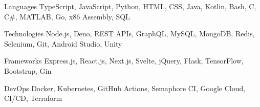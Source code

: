 

\begin{cvskills}

  \cvskill
    {Languages} %
    {TypeScript, JavaScript, Python, HTML, CSS, Java, Kotlin, Bash, C, C\#, MATLAB, Go, x86 Assembly, SQL } %

  \cvskill
    {Technologies} %
    {Node.js, Deno, REST APIs, GraphQL, MySQL, MongoDB, Redis, Selenium, Git, Android Studio, Unity} %

  \cvskill
    {Frameworks} %
    {Express.js, React.js, Next.js, Svelte, jQuery, Flask, TensorFlow, Bootstrap, Gin} %

  \cvskill
    {DevOps} %
    {Docker, Kubernetes, GitHub Actions, Semaphore CI, Google Cloud, CI/CD, Terraform} %

\end{cvskills}
